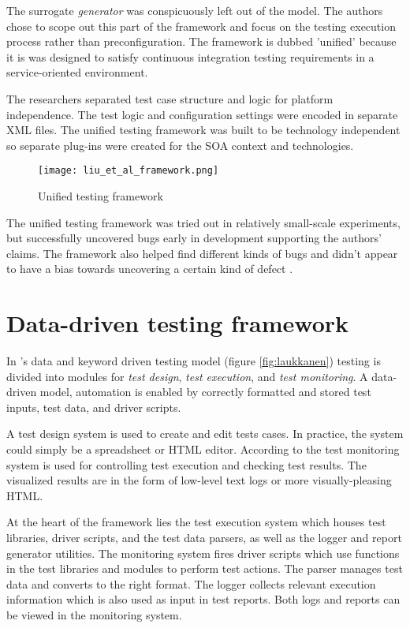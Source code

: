 \documentclass[12pt,a4paper,oneside,pdftex]{report}
\begin{document}
The surrogate \emph{generator} was conspicuously left out of the model. The authors chose to scope out this part of the framework and focus on the testing execution process rather than preconfiguration. The framework is dubbed 'unified' because it is was designed to satisfy continuous integration testing requirements in a service-oriented environment.

The researchers separated test case structure and logic for platform independence. The test logic and configuration settings were encoded in separate XML files. The unified testing framework was built to be technology independent so 
separate plug-ins were created for the SOA context and technologies.

\begin{figure}[H]
  \begin{center}
    \texttt{[image: liu\_et\_al\_framework.png]}
    \caption{Unified testing framework \citep{liu2009unified}}
    \label{fig:liu}
  \end{center}
\end{figure}

The unified testing framework was tried out in relatively small-scale experiments, but successfully uncovered bugs early in development supporting the authors' claims. The framework also helped find different kinds of bugs and didn't appear to have a bias towards uncovering a certain kind of defect \citep{liu2009unified}.

\section{Data-driven testing framework}

In \citeauthor{laukkanen2006data}'s \citeyearpar{laukkanen2006data} data and keyword driven testing model (figure \ref{fig:laukkanen}) testing is divided into modules for \emph{test design}, \emph{test execution}, and \emph{test monitoring}. A data-driven model, automation is enabled by correctly formatted and stored test inputs, test data, and driver scripts.

A test design system is used to create and edit tests cases. In practice, the system could simply be a spreadsheet or HTML editor. According to \citet{laukkanen2006data} the test monitoring system is used for controlling test execution and checking test results. The visualized results are in the form of low-level text logs or more visually-pleasing HTML.

At the heart of the framework lies the test execution system which houses test libraries, driver scripts, and the test data parsers, as well as the logger and report generator utilities. The monitoring system fires driver scripts which use functions in the test libraries and modules to perform test actions. The parser manages test data and converts to the right format. The logger collects relevant execution information which is also used as input in test reports. Both logs and reports can be viewed in the monitoring system. \citep{laukkanen2006data}
\end{document}
